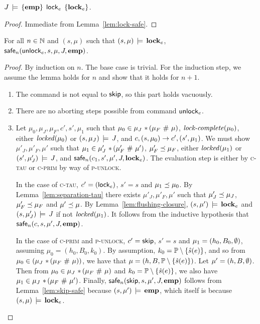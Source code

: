 \documentclass[11pt]{report}         %
\begin{document}
\begin{lemma}
    \label{lem:lock-sound}
    $J\,\models\,\left\lbrace \mathbf{emp} \right\rbrace\;\operatorname{\mathsf{lock}}_{e}\;\left\lbrace \mathbf{lock}_{e} \right\rbrace$. 
\end{lemma} 

\begin{proof}
    Immediate from Lemma~\ref{lem:lock-safe}. 
\end{proof}

\begin{lemma}
    \label{lem:unlock-safe}
    For all $n \in \mathbb{N}$ and $(s,\mu)$ such that $(s,\mu) \,\models\, \mathbf{lock}_{e}$, \\ $\mathsf{safe}_{n}(\operatorname{\mathsf{unlock}}_{e},s,\mu,J,\mathbf{emp})$. 
\end{lemma}

\begin{proof}
  By induction on $n$. The base case is trivial. For the induction step, we assume the lemma holds for $n$ and show that it holds for $n+1$.

    \begin{enumerate}
        \item The command is not equal to $\operatorname{\mathsf{skip}}$, so this part holds vacuously. 

        \item There are no aborting steps possible from command $\operatorname{\mathsf{unlock}}_e$. 

        \item Let $\mu_0,\mu_J,\mu_F,c',s',\mu_1$ such that $\mu_0 \in \mu_J \operatorname{\,\ast\,} (\mu_F \operatorname{\,\#\,} \mu)$, $\text{\textit{lock-complete}}(\mu_0)$, either $\mathit{locked}(\mu_0)$ or $(s,\mu_J) \,\models\, J$, and $c,(s,\mu_0) \rightarrow c',(s',\mu_1)$. We must show $\mu'_J,\mu'_F,\mu'$ such that $\mu_1 \in \mu'_J \operatorname{\,\ast\,} (\mu'_F \operatorname{\,\#\,} \mu')$, $\mu'_F \preceq \mu_F$, either $\mathit{locked}(\mu_1)$ or $(s',\mu'_J) \,\models\, J$, and $\mathsf{safe}_{n}(c_1,s',\mu',J,\mathbf{lock}_{e})$. The evaluation step is either by \textsc{c-tau} or \textsc{c-prim} by way of \textsc{p-unlock}. 

        In the case of \textsc{c-tau}, $c' = (\operatorname{\mathsf{lock}}_{e})$, $s' = s$ and $\mu_1 \preceq \mu_0$. By Lemma~\ref{lem:separation-tau} there exists $\mu'_J,\mu'_F,\mu'$ such that $\mu'_J \preceq \mu_J$, $\mu'_F \preceq \mu_F$ and $\mu' \preceq \mu$. By Lemma~\ref{lem:flushing-closure}, $(s,\mu') \,\models\, \mathbf{lock}_{e}$ and $(s,\mu'_J) \,\models\, J$ if not $\mathit{locked}(\mu_1)$. It follows from the inductive hypothesis that $\mathsf{safe}_{n}(c,s,\mu',J,\mathbf{emp})$. 

        In the case of \textsc{c-prim} and \textsc{p-unlock}, $c' = \operatorname{\mathsf{skip}}$, $s' = s$ and $\mu_1 = (h_0,B_0,\operatorname{\emptyset})$, assuming $\mu_0 = (h_0,B_0,k_0)$. By assumption, $k_0 = \mathbb{P} \setminus \left\lbrace \hat{s}(e) \right\rbrace$, and so from $\mu_0  \in (\mu_J \operatorname{\,\ast\,} (\mu_F \operatorname{\,\#\,} \mu))$, we have that $\mu = (h,B,\mathbb{P} \setminus \left\lbrace \hat{s}(e) \right\rbrace)$. Let $\mu' = (h,B,\operatorname{\emptyset})$. Then from $\mu_0 \in \mu_J \operatorname{\,\ast\,} (\mu_F \operatorname{\,\#\,} \mu)$ and $k_0 = \mathbb{P} \setminus \left\lbrace \hat{s}(e) \right\rbrace$, we also have $\mu_1 \in \mu_J \operatorname{\,\ast\,} (\mu_F \operatorname{\,\#\,} \mu')$. Finally, $\mathsf{safe}_{n}(\operatorname{\mathsf{skip}},s,\mu',J,\mathbf{emp})$ follows from Lemma~\ref{lem:skip-safe} because $(s,\mu') \,\models\, \mathbf{emp}$, which itself is because $(s,\mu) \,\models\, \mathbf{lock}_{e}$.  


\end{enumerate}
\end{proof}
\end{document}
